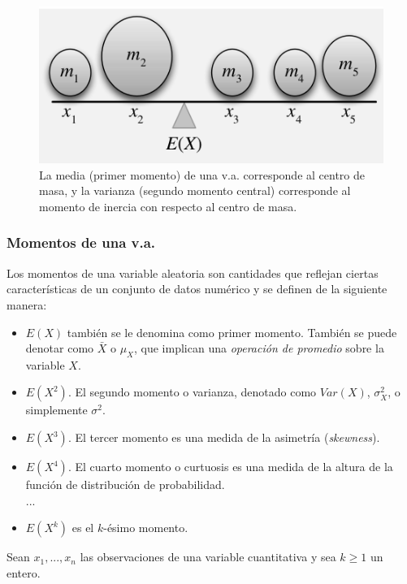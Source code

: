 \begin{figure}[h!]
  \centering
  \includegraphics[scale=0.5]{../slides/figures/physics_moment.png}
    \caption{La media (primer momento) de una v.a. corresponde al centro de masa, y
    la varianza (segundo momento central) corresponde al momento de inercia con
    respecto al centro de masa.}
\end{figure}
  
\subsubsection{Momentos de una v.a.}

Los momentos de una variable aleatoria son cantidades que reflejan ciertas
características de un conjunto de datos numérico y se definen de la
siguiente manera:
  
\begin{itemize}
\item $E(X)$ también se le denomina como primer momento. También se puede
denotar como $\bar{X}$ o $\mu_{X}$, que implican una \textit{operación de
promedio} sobre la variable $X$.
\item $E(X^2)$. El segundo momento o varianza, denotado como $Var(X)$,
$\sigma_{X}^{2}$, o simplemente $\sigma^{2}$.
\item $E(X^3)$. El tercer momento es una medida de la asimetría
(\textit{skewness}).\\
\item $E(X^4)$. El cuarto momento o curtuosis es una medida de la altura de la
función de distribución de probabilidad.\\
  ...\\
  \item $E(X^k)$ es el $k$-ésimo momento.
\end{itemize}
  
Sean $x_1,...,x_n$ las observaciones de una variable cuantitativa y sea $k \geq
1$ un entero.


